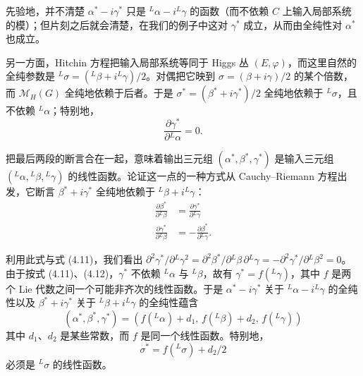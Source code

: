 \documentclass[11pt,a4paper]{article}
\begin{document}
先验地，并不清楚 $\alpha^*-i\gamma^*$ 只是 ${}^L\alpha-i{}^L\gamma$ 的函数（而不依赖 $C$ 上输入局部系统的模）；但片刻之后就会清楚，在我们的例子中这对 $\gamma^*$ 成立，从而由全纯性对 $\alpha^*$ 也成立。

另一方面，Hitchin 方程把输入局部系统等同于 Higgs 丛 $(E,\varphi)$，而这里自然的全纯参数是 ${}^L\sigma=({}^L\beta+i{}^L\gamma)/2$。对偶把它映到 $\sigma=(\beta+i\gamma)/2$ 的某个倍数，而 $\mathcal{M}_H(G)$ 全纯地依赖于后者。于是 $\sigma^*=(\beta^*+i\gamma^*)/2$ 全纯地依赖于 ${}^L\sigma$，且不依赖 ${}^L\alpha$；特别地，
\begin{equation}\tag{4.12}
\frac{\partial\gamma^*}{\partial{}^L\alpha}=0.
\end{equation}

把最后两段的断言合在一起，意味着输出三元组 $(\alpha^*,\beta^*,\gamma^*)$ 是输入三元组 $({}^L\alpha,{}^L\beta,{}^L\gamma)$ 的线性函数。论证这一点的一种方式从 Cauchy--Riemann 方程出发，它断言 $\beta^*+i\gamma^*$ 全纯地依赖于
${}^L\beta+i{}^L\gamma$：
\begin{equation}\tag{4.13}
\begin{aligned}
\frac{\partial\beta^*}{\partial{}^L\beta}&=\frac{\partial\gamma^*}{\partial{}^L\gamma}\\
\frac{\partial\gamma^*}{\partial{}^L\beta}&=-\frac{\partial\beta^*}{\partial{}^L\gamma}.
\end{aligned}
\end{equation}

利用此式与式 (4.11)，我们看出 $\partial^2\gamma^*/\partial{}^L\gamma^2=\partial^2\beta^*/\partial{}^L\beta\,\partial{}^L\gamma=-\partial^2\gamma^*/\partial{}^L\beta^2=0$。由于按式 (4.11)、(4.12)，$\gamma^*$ 不依赖 ${}^L\alpha$ 与 ${}^L\beta$，故有 $\gamma^*=f({}^L\gamma)$，其中 $f$ 是两个 Lie 代数之间一个可能非齐次的线性函数。于是 $\alpha^*-i\gamma^*$ 关于 ${}^L\alpha-i{}^L\gamma$ 的全纯性以及 $\beta^*+i\gamma^*$ 关于 ${}^L\beta+i{}^L\gamma$ 的全纯性蕴含
\begin{equation}\tag{4.14}
(\alpha^*,\beta^*,\gamma^*)=(f({}^L\alpha)+d_1,\,f({}^L\beta)+d_2,\,f({}^L\gamma))
\end{equation}
其中 $d_1$、$d_2$ 是某些常数，而 $f$ 是同一个线性函数。特别地，
\begin{equation}\tag{4.15}
\sigma^*=f({}^L\sigma)+d_2/2
\end{equation}
必须是 ${}^L\sigma$ 的线性函数。
\end{document}
